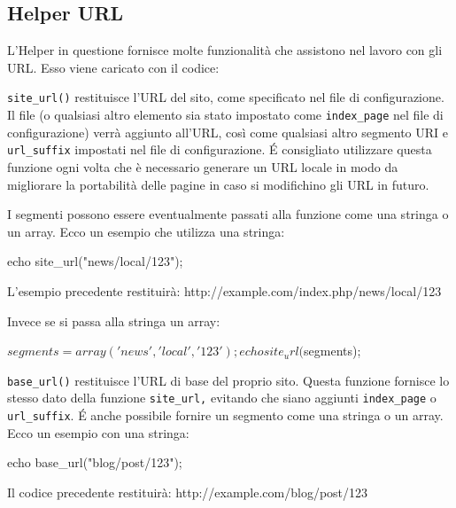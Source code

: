 \subsection{Helper URL}
\label{helper:url}

L'Helper in questione fornisce molte funzionalità che assistono nel lavoro con gli URL. Esso viene caricato con il codice:


\verb|site_url()| restituisce l'URL del sito, come specificato nel file di configurazione. Il file  (o qualsiasi altro elemento sia stato impostato come \verb|index_page| nel file di configurazione) verrà aggiunto all'URL, così come qualsiasi altro segmento URI e \verb|url_suffix| impostati nel file di configurazione. \'E consigliato utilizzare questa funzione ogni volta che è necessario generare un URL locale in modo da migliorare la portabilità delle pagine in caso si modifichino gli URL in futuro. 

I segmenti possono essere eventualmente passati alla funzione come una stringa o un array. Ecco un esempio che utilizza una stringa:

\begin{code}
echo site_url("news/local/123");
\end{code}

L'esempio precedente restituirà: http://example.com/index.php/news/local/123

Invece se si passa alla stringa un array:

\begin{code}
$segments = array('news', 'local', '123');

echo site_url($segments);
\end{code}

\verb|base_url()| restituisce l'URL di base del proprio sito. Questa funzione fornisce lo stesso dato della funzione \verb|site_url,| evitando che siano aggiunti \verb|index_page| o \verb|url_suffix|. \'E anche possibile fornire un segmento come una stringa o un array. Ecco un esempio con una stringa:

\begin{code}
echo base_url("blog/post/123");
\end{code}

Il codice precedente restituirà: http://example.com/blog/post/123

